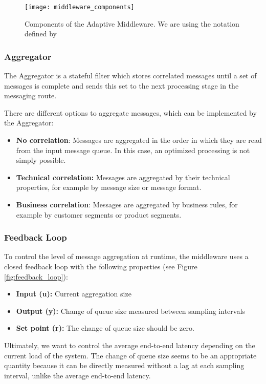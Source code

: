 \begin{figure*}[!t]
	\centering
	\texttt{[image: middleware\_components]}
	\caption{Components of the Adaptive Middleware. We are using the notation defined by \cite{Hohpe:2003fk}}
	\label{fig:middleware_components}
\end{figure*}

\subsubsection{Aggregator}
The Aggregator is a stateful filter which stores correlated messages until a set of messages is complete and sends this set to the next processing stage in the messaging route. 

There are different options to aggregate messages, which can be implemented by the Aggregator:

\begin{itemize}
	\item \textbf{No correlation}: Messages are aggregated in the order in which they are read from the input message queue. In this case, an optimized processing is not simply possible.
	\item \textbf{Technical correlation:} Messages are aggregated by their technical properties, for example by message size or message format.
	\item \textbf{Business correlation}: Messages are aggregated by business rules, for example by customer segments or product segments.
\end{itemize}

\subsubsection{Feedback Loop}

To control the level of message aggregation at runtime, the middleware uses a closed feedback loop with the following properties (see Figure \ref{fig:feedback_loop}):

\begin{itemize}
	\item \textbf{Input (u):} Current aggregation size
	\item \textbf{Output (y):} Change of queue size measured between sampling intervals
	\item \textbf{Set point (r):} The change of queue size should be zero.
\end{itemize}

Ultimately, we want to control the average end-to-end latency depending on the current load of the system. The change of queue size seems to be an appropriate quantity because it can be directly measured without a lag at each sampling interval, unlike the average end-to-end latency.


